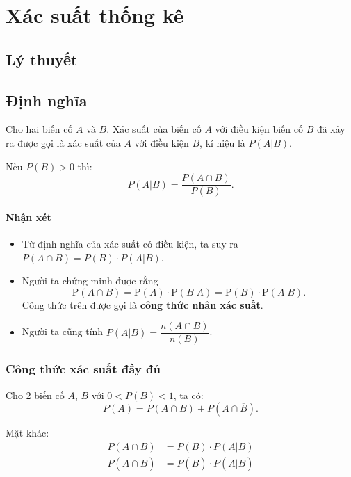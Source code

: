 \documentclass[twoside,final]{hcmut-report}
\begin{document}
\coverpage\clearpage
\tableofcontents
\clearpage

\fancyfoot{}

\setcounter{page}{1}
\section{Xác suất thống kê}
\subsection{Lý thuyết}
\subsection{Định nghĩa}
Cho hai biến cố $A$ và $B$. Xác suất của biến cố $A$ với điều kiện biến cố $B$ đã xảy ra được gọi là xác suất của $A$ với điều kiện $B$, kí hiệu là $P(A | B)$.

Nếu $P(B) > 0$ thì:
\[
    P(A | B) = \frac{P(A \cap B)}{P(B)}.
\]
\paragraph*{Nhận xét}
\begin{itemize}[itemsep=0pt, topsep=0pt, parsep=0pt,label=-]
    \item Từ định nghĩa của xác suất có điều kiện, ta suy ra $P(A \cap B) = P(B) \cdot P(A | B)$.
    \item Người ta chứng minh được rằng
          \[
              \mathrm{P}(A \cap B) = \mathrm{P}(A) \cdot \mathrm{P}(B | A) = \mathrm{P}(B) \cdot \mathrm{P}(A | B).
          \]
          Công thức trên được gọi là \textbf{công thức nhân xác suất}.
    \item Người ta cũng tính $P(A | B) = \dfrac{n(A \cap B)}{n(B)}$.
\end{itemize}
\subsubsection{Công thức xác suất đầy đủ}
Cho 2 biến cố $A$, $B$ với $0 < P(B) < 1$, ta có:
\[
    P(A) = P(A \cap B) + P(A \cap \overline{B}).
\]

Mặt khác:
\begin{align*}
    P(A \cap B)            & = P(B) \cdot P(A | B)                       \\
    P(A \cap \overline{B}) & = P(\overline{B}) \cdot P(A | \overline{B})
\end{align*}
\end{document}
